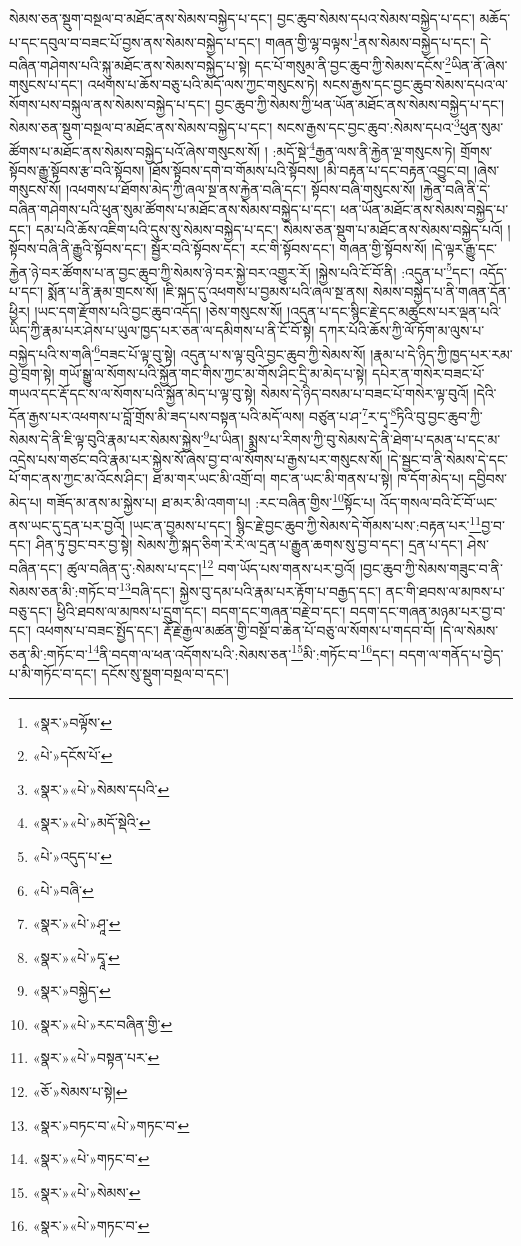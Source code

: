 སེམས་ཅན་སྡུག་བསྔལ་བ་མཐོང་ནས་སེམས་བསྐྱེད་པ་དང་། བྱང་ཆུབ་སེམས་དཔའ་སེམས་བསྐྱེད་པ་དང་། མཆོད་པ་དང་དབུལ་བ་བཟང་པོ་བྱས་ནས་སེམས་བསྐྱེད་པ་དང་། གཞན་གྱི་ལྷ་བལྟས་\footnote{«སྣར་»བལྟོས་}ནས་སེམས་བསྐྱེད་པ་དང་། དེ་བཞིན་གཤེགས་པའི་སྐུ་མཐོང་ནས་སེམས་བསྐྱེད་པ་སྟེ། དང་པོ་གསུམ་ནི་བྱང་ཆུབ་ཀྱི་སེམས་དངོས་\footnote{«པེ་»དངོས་པོ་}ཡིན་ནོ་ཞེས་གསུངས་པ་དང་། འཕགས་པ་ཆོས་བཅུ་པའི་མདོ་ལས་ཀྱང་གསུངས་ཏེ། སངས་རྒྱས་དང་བྱང་ཆུབ་སེམས་དཔའ་ལ་སོགས་པས་བསྐུལ་ནས་སེམས་བསྐྱེད་པ་དང་། བྱང་ཆུབ་ཀྱི་སེམས་ཀྱི་ཕན་ཡོན་མཐོང་ནས་སེམས་བསྐྱེད་པ་དང་། སེམས་ཅན་སྡུག་བསྔལ་བ་མཐོང་ནས་སེམས་བསྐྱེད་པ་དང་། སངས་རྒྱས་དང་བྱང་ཆུབ་:སེམས་དཔའ་\footnote{«སྣར་»«པེ་»སེམས་དཔའི་}ཕུན་སུམ་ཚོགས་པ་མཐོང་ནས་སེམས་བསྐྱེད་པའོ་ཞེས་གསུངས་སོ། །
:མདོ་སྡེ་\footnote{«སྣར་»«པེ་»མདོ་སྡེའི་}རྒྱན་ལས་ནི་རྐྱེན་ལྔ་གསུངས་ཏེ། གྲོགས་སྟོབས་རྒྱུ་སྟོབས་རྩ་བའི་སྟོབས། །ཐོས་སྟོབས་དགེ་བ་གོམས་པའི་སྟོབས། །མི་བརྟན་པ་དང་བརྟན་འབྱུང་བ། །ཞེས་གསུངས་སོ། །འཕགས་པ་ཐོགས་མེད་ཀྱི་ཞལ་སྔ་ནས་རྐྱེན་བཞི་དང་། སྟོབས་བཞི་གསུངས་སོ། །རྐྱེན་བཞི་ནི་དེ་བཞིན་གཤེགས་པའི་ཕུན་སུམ་ཚོགས་པ་མཐོང་ནས་སེམས་བསྐྱེད་པ་དང་། ཕན་ཡོན་མཐོང་ནས་སེམས་བསྐྱེད་པ་དང་། དམ་པའི་ཆོས་འཇིག་པའི་དུས་སུ་སེམས་བསྐྱེད་པ་དང་། སེམས་ཅན་སྡུག་པ་མཐོང་ནས་སེམས་བསྐྱེད་པའོ། །སྟོབས་བཞི་ནི་རྒྱུའི་སྟོབས་དང་། སྦྱོར་བའི་སྟོབས་དང་། རང་གི་སྟོབས་དང་། གཞན་གྱི་སྟོབས་སོ། །དེ་ལྟར་རྒྱུ་དང་རྐྱེན་ཉེ་བར་ཚོགས་པ་ན་བྱང་ཆུབ་ཀྱི་སེམས་ཉེ་བར་སྐྱེ་བར་འགྱུར་རོ། །སྐྱེས་པའི་ངོ་བོ་ནི། :འདུན་པ་\footnote{«པེ་»འདུད་པ་}དང་། འདོད་པ་དང་། སྨོན་པ་ནི་རྣམ་གྲངས་སོ། །ཇི་སྐད་དུ་འཕགས་པ་བྱམས་པའི་ཞལ་སྔ་ནས། སེམས་བསྐྱེད་པ་ནི་གཞན་དོན་ཕྱིར། །ཡང་དག་རྫོགས་པའི་བྱང་ཆུབ་འདོད། །ཅེས་གསུངས་སོ། །འདུན་པ་དང་སྙིང་རྗེ་དང་མཚུངས་པར་ལྡན་པའི་ཡིད་ཀྱི་རྣམ་པར་ཤེས་པ་ཡུལ་ཁྱད་པར་ཅན་ལ་དམིགས་པ་ནི་ངོ་བོ་སྟེ། དཀར་པོའི་ཆོས་ཀྱི་ལོ་ཏོག་མ་ལུས་པ་བསྐྱེད་པའི་ས་གཞི་\footnote{«པེ་»བཞི་}བཟང་པོ་ལྟ་བུ་སྟེ། འདུན་པ་ས་ལྟ་བུའི་བྱང་ཆུབ་ཀྱི་སེམས་སོ། །རྣམ་པ་དེ་ཉིད་ཀྱི་ཁྱད་པར་རམ་བྱེ་བྲག་སྟེ། གཡོ་སྒྱུ་ལ་སོགས་པའི་སྐྱོན་གང་གིས་ཀྱང་མ་གོས་ཤིང་དྲི་མ་མེད་པ་སྟེ། དཔེར་ན་གསེར་བཟང་པོ་གཡའ་དང་རྡོ་དང་ས་ལ་སོགས་པའི་སྐྱོན་མེད་པ་ལྟ་བུ་སྟེ། སེམས་དེ་ཉིད་བསམ་པ་བཟང་པོ་གསེར་ལྟ་བུའོ། །དེའི་དོན་རྒྱས་པར་འཕགས་པ་བློ་གྲོས་མི་ཟད་པས་བསྟན་པའི་མདོ་ལས། བཙུན་པ་ཤ་\footnote{«སྣར་»«པེ་»ཤཱ་}ར་དྭ་\footnote{«སྣར་»«པེ་»དྭཱ་}ཏིའི་བུ་བྱང་ཆུབ་ཀྱི་སེམས་དེ་ནི་ཇི་ལྟ་བུའི་རྣམ་པར་སེམས་སྐྱེས་\footnote{«སྣར་»བསྐྱེད་}པ་ཡིན། སྨྲས་པ་རིགས་ཀྱི་བུ་སེམས་དེ་ནི་ཐེག་པ་དམན་པ་དང་མ་འདྲེས་པས་གཙང་བའི་རྣམ་པར་སྐྱེས་སོ་ཞེས་བྱ་བ་ལ་སོགས་པ་རྒྱས་པར་གསུངས་སོ། །དེ་སྦྱང་བ་ནི་སེམས་དེ་དང་པོ་གང་ནས་ཀྱང་མ་འོངས་ཤིང་། ཐ་མ་གར་ཡང་མི་འགྲོ་བ། གང་ན་ཡང་མི་གནས་པ་སྟེ། ཁ་དོག་མེད་པ། དབྱིབས་མེད་པ། གཟོད་མ་ནས་མ་སྐྱེས་པ། ཐ་མར་མི་འགག་པ། :རང་བཞིན་གྱིས་\footnote{«སྣར་»«པེ་»རང་བཞིན་གྱི་}སྟོང་པ། འོད་གསལ་བའི་ངོ་བོ་ཡང་ནས་ཡང་དུ་དྲན་པར་བྱའོ། །ཡང་ན་བྱམས་པ་དང་། སྙིང་རྗེ་བྱང་ཆུབ་ཀྱི་སེམས་དེ་གོམས་པས་:བརྟན་པར་\footnote{«སྣར་»«པེ་»བསྟན་པར་}བྱ་བ་དང་། ཤིན་ཏུ་བྱང་བར་བྱ་སྟེ། སེམས་ཀྱི་སྐད་ཅིག་རེ་རེ་ལ་དྲན་པ་རྒྱུན་ཆགས་སུ་བྱ་བ་དང་། དྲན་པ་དང་། ཤེས་བཞིན་དང་། ཚུལ་བཞིན་དུ་:སེམས་པ་དང་།\footnote{«ཅོ་»སེམས་པ་སྟེ།} བག་ཡོད་པས་གནས་པར་བྱའོ། །བྱང་ཆུབ་ཀྱི་སེམས་གཟུང་བ་ནི་སེམས་ཅན་མི་:གཏོང་བ་\footnote{«སྣར་»བཏང་བ་«པེ་»གཏང་བ་}བཞི་དང་། སྐྱེས་བུ་དམ་པའི་རྣམ་པར་རྟོག་པ་བརྒྱད་དང་། ནང་གི་ཐབས་ལ་མཁས་པ་བཅུ་དང་། ཕྱིའི་ཐབས་ལ་མཁས་པ་དྲུག་དང་། བདག་དང་གཞན་བརྗེ་བ་དང་། བདག་དང་གཞན་མཉམ་པར་བྱ་བ་དང་། འཕགས་པ་བཟང་སྤྱོད་དང་། རྡོ་རྗེ་རྒྱལ་མཚན་གྱི་བསྔོ་བ་ཆེན་པོ་བཅུ་ལ་སོགས་པ་གདབ་བོ། །དེ་ལ་སེམས་ཅན་མི་:གཏོང་བ་\footnote{«སྣར་»«པེ་»གཏང་བ་}ནི་བདག་ལ་ཕན་འདོགས་པའི་:སེམས་ཅན་\footnote{«སྣར་»«པེ་»སེམས་}མི་:གཏོང་བ་\footnote{«སྣར་»«པེ་»གཏང་བ་}དང་། བདག་ལ་གནོད་པ་བྱེད་པ་མི་གཏོང་བ་དང་། དངོས་སུ་སྡུག་བསྔལ་བ་དང་། 